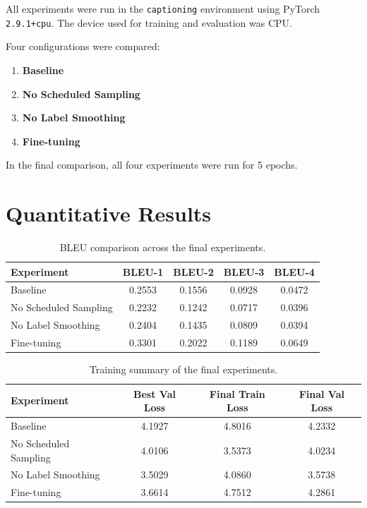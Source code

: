 \documentclass[11pt,a4paper]{article}
\begin{document}
All experiments were run in the \texttt{captioning} environment using PyTorch \texttt{2.9.1+cpu}. The device used for training and evaluation was CPU.

Four configurations were compared:
\begin{enumerate}[leftmargin=*]
    \item \textbf{Baseline}
    \item \textbf{No Scheduled Sampling}
    \item \textbf{No Label Smoothing}
    \item \textbf{Fine-tuning}
\end{enumerate}

In the final comparison, all four experiments were run for 5 epochs.

\section{Quantitative Results}

\begin{table}[H]
\centering
\caption{BLEU comparison across the final experiments.}
\begin{tabular}{lcccc}
\toprule
Experiment & BLEU-1 & BLEU-2 & BLEU-3 & BLEU-4 \\
\midrule
Baseline & 0.2553 & 0.1556 & 0.0928 & 0.0472 \\
No Scheduled Sampling & 0.2232 & 0.1242 & 0.0717 & 0.0396 \\
No Label Smoothing & 0.2404 & 0.1435 & 0.0809 & 0.0394 \\
Fine-tuning & 0.3301 & 0.2022 & 0.1189 & 0.0649 \\
\bottomrule
\end{tabular}
\end{table}

\begin{table}[H]
\centering
\caption{Training summary of the final experiments.}
\begin{tabular}{lccc}
\toprule
Experiment & Best Val Loss & Final Train Loss & Final Val Loss \\
\midrule
Baseline & 4.1927 & 4.8016 & 4.2332 \\
No Scheduled Sampling & 4.0106 & 3.5373 & 4.0234 \\
No Label Smoothing & 3.5029 & 4.0860 & 3.5738 \\
Fine-tuning & 3.6614 & 4.7512 & 4.2861 \\
\bottomrule
\end{tabular}
\end{table}
\end{document}
